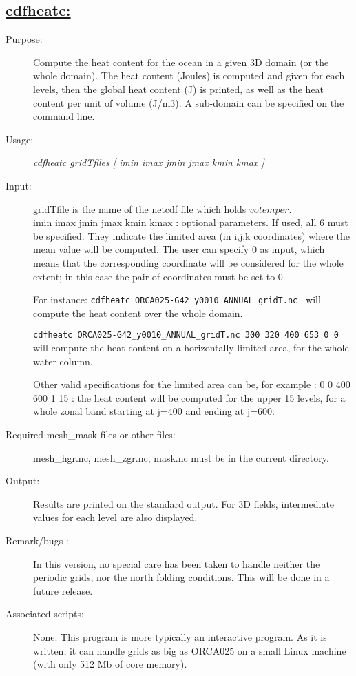 \documentclass[a4paper,11pt]{article}
\begin{document}
\subsection*{\underline{cdfheatc:}}
\begin{description}
\item[Purpose:] Compute the heat content for the ocean in a given 3D domain (or the whole domain).
The heat content (Joules) is computed and given for each levels, then the global heat content (J) is printed, as well as the heat
content per unit of volume (J/m3). A sub-domain can be specified  on the command line.
\item[Usage:] {\em cdfheatc gridTfiles  [ imin imax jmin jmax kmin kmax ] }
\item[Input:] gridTfile is the name of the netcdf file which holds $votemper$.  \\

imin imax jmin jmax  kmin kmax : optional parameters. If used, all 6 must be specified. They indicate the limited
area (in i,j,k coordinates) where the mean value will be computed. The user can specify 0 as input, which means that
the corresponding coordinate will be considered for the whole extent; in this case the pair of coordinates must be set 
to 0. 

For instance: {\tt cdfheatc  ORCA025-G42\_y0010\_ANNUAL\_gridT.nc  } will compute the heat content over
the whole domain.

 {\tt cdfheatc  ORCA025-G42\_y0010\_ANNUAL\_gridT.nc 300 320 400 653 0 0 } will compute the heat content 
on a horizontally limited area, for the whole water column. 

 Other valid specifications for the limited area 
can be, for example : 0 0  400 600 1 15 : the heat content will be computed for the upper 15 levels, for a whole zonal band starting
at j=400 and ending at j=600.

\item[Required mesh\_mask files or other files:]   mesh\_hgr.nc, mesh\_zgr.nc, mask.nc must be in the current directory.
\item[Output:] Results are printed  on the standard output. For 3D fields, intermediate  values for each level are also
displayed.
\item[Remark/bugs :] In this version, no special care has been taken to handle neither the periodic grids, nor the north folding conditions.
This will be done in a future release.
\item[Associated scripts:] {None. This program is more typically an interactive program. As it is written, it can handle grids as big
as ORCA025 on a small Linux machine (with only 512 Mb of core memory).}
\end{description}
\end{document}
